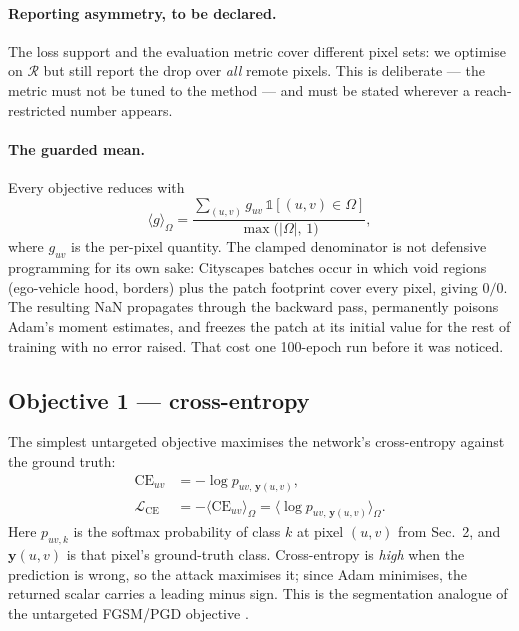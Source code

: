 \documentclass[11pt,a4paper]{article}
\begin{document}
\paragraph{Reporting asymmetry, to be declared.}
The loss support and the evaluation metric cover different pixel sets: we
optimise on $\mathcal{R}$ but still report the drop over \emph{all} remote
pixels. This is deliberate --- the metric must not be tuned to the method
--- and must be stated wherever a reach-restricted number appears.

\paragraph{The guarded mean.}
Every objective reduces with
\begin{equation}
  \langle g\rangle_\Omega
  = \frac{\sum_{(u,v)} g_{uv}\,\mathbb{1}[(u,v)\in\Omega]}
         {\max\big(|\Omega|,\,1\big)} ,
  \label{eq:reduce}
\end{equation}
where $g_{uv}$ is the per-pixel quantity. The clamped denominator is not
defensive programming for its own sake: Cityscapes batches occur in which
void regions (ego-vehicle hood, borders) plus the patch footprint cover
every pixel, giving $0/0$. The resulting NaN propagates through the backward
pass, permanently poisons Adam's moment estimates, and freezes the patch at
its initial value for the rest of training with no error raised. That cost
one 100-epoch run before it was noticed.

\subsection{Objective 1 --- cross-entropy}

The simplest untargeted objective maximises the network's cross-entropy
against the ground truth:
\begin{align}
  \mathrm{CE}_{uv} &= -\log p_{uv,\,\mathbf{y}(u,v)},
     \label{eq:ce}\\
  \mathcal{L}_{\mathrm{CE}}
     &= -\big\langle \mathrm{CE}_{uv}\big\rangle_\Omega
      = \big\langle \log p_{uv,\,\mathbf{y}(u,v)}\big\rangle_\Omega .
  \label{eq:celoss}
\end{align}
Here $p_{uv,k}$ is the softmax probability of class $k$ at pixel $(u,v)$
from Sec.~2, and $\mathbf{y}(u,v)$ is that pixel's ground-truth class.
Cross-entropy is \emph{high} when the prediction is wrong, so the attack
maximises it; since Adam minimises, the returned scalar carries a leading
minus sign. This is the segmentation analogue of the untargeted FGSM/PGD
objective \citep{goodfellow2015fgsm,madry2018pgd}.
\end{document}
